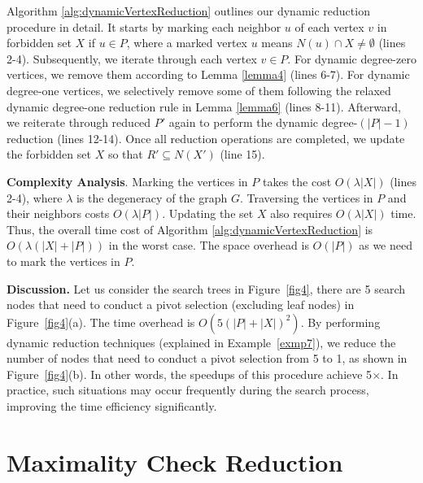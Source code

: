 \documentclass[sigconf, nonacm]{acmart}
\begin{document}
Algorithm \ref{alg:dynamicVertexReduction} outlines our dynamic reduction procedure in detail. It starts by marking each neighbor $u$ of each vertex $v$ in forbidden set $X$ if $u\in P$, where a marked vertex $u$ means $N(u)\cap X \neq \emptyset$ (lines 2-4). Subsequently, we iterate through each vertex $v \in P$. 
For dynamic degree-zero vertices, we remove them according to Lemma \ref{lemma4} (lines 6-7). For dynamic degree-one vertices, we selectively remove some of them following the relaxed dynamic degree-one reduction rule in Lemma \ref{lemma6} (lines 8-11). Afterward, we reiterate through reduced $P'$ again to perform the dynamic degree-$(\lvert P\rvert-1)$ reduction (lines 12-14). %
Once all reduction operations are completed, we update the forbidden set $X$ so that $R'\subseteq N(X')$ %
(line 15).


\noindent\textbf{Complexity Analysis}. 
Marking the vertices in $P$ takes the cost $O(\lambda\lvert X \rvert)$  (lines 2-4), where $\lambda$ is the degeneracy of the  graph $G$.  
Traversing the vertices in $P$ and their neighbors costs $O(\lambda\lvert P\rvert)$. Updating the set $X$ also requires $O(\lambda\lvert X \rvert)$ time. Thus, 
the overall time cost of Algorithm \ref{alg:dynamicVertexReduction} is $O(\lambda(\lvert X\rvert+\lvert P\rvert))$ in the worst case.
The space overhead is $O(\lvert P \rvert)$ as we need to mark the vertices in $P$.

\noindent \textbf{Discussion.} %
Let us consider the search trees in Figure~\ref{fig4}, there are 5 search nodes that need to conduct a pivot selection (excluding leaf nodes) in Figure~\ref{fig4}(a). The time overhead is $O(5(|P|+|X|)^2)$. By performing dynamic reduction techniques (explained in Example~\ref{exmp7}), we reduce the number of nodes that need to conduct a pivot selection from 5 to 1, as shown in Figure~\ref{fig4}(b). %
In other words, the speedups of this procedure achieve 5$\times$.
In practice, such situations may occur %
frequently 
during the search process, %
improving the time efficiency significantly. 




\section{Maximality Check Reduction}\label{sec6}
\end{document}
